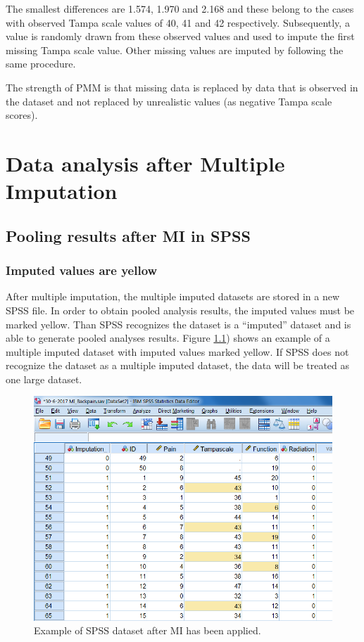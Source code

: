 \documentclass[]{book}
\theoremstyle{definition}
\theoremstyle{definition}
\theoremstyle{definition}
\theoremstyle{remark}
\begin{document}
The smallest differences are 1.574, 1.970 and 2.168 and these belong to
the cases with observed Tampa scale values of 40, 41 and 42
respectively. Subsequently, a value is randomly drawn from these
observed values and used to impute the first missing Tampa scale value.
Other missing values are imputed by following the same procedure.

The strength of PMM is that missing data is replaced by data that is
observed in the dataset and not replaced by unrealistic values (as
negative Tampa scale scores).

\chapter{Data analysis after Multiple
Imputation}\label{data-analysis-after-multiple-imputation}

\section{Pooling results after MI in
SPSS}\label{pooling-results-after-mi-in-spss}

\subsection{Imputed values are yellow}\label{imputed-values-are-yellow}

After multiple imputation, the multiple imputed datasets are stored in a
new SPSS file. In order to obtain pooled analysis results, the imputed
values must be marked yellow. Than SPSS recognizes the dataset is a
``imputed'' dataset and is able to generate pooled analyses results.
Figure \ref{fig:fig5-1}) shows an example of a multiple imputed dataset
with imputed values marked yellow. If SPSS does not recognize the
dataset as a multiple imputed dataset, the data will be treated as one
large dataset.

\begin{figure}

{\centering \includegraphics[width=0.9\linewidth]{images/fig5.1} 

}

\caption{Example of SPSS dataset after MI has been applied.}\label{fig:fig5-1}
\end{figure}
\end{document}

